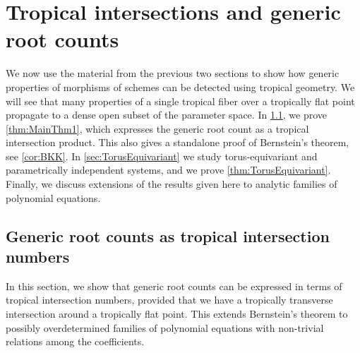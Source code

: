 \documentclass[12pt,reqno,a4paper]{amsart}
\theoremstyle{theoremstyle}
\theoremstyle{examplestyle}
\theoremstyle{algorithmstyle}
\begin{document}
\section{Tropical intersections and generic root counts}\label{sec:TropGeneric}

We now use the material from the previous two sections to show how generic properties of morphisms of schemes can be detected using tropical geometry. We will see that many properties of a single tropical fiber over a tropically flat point propagate to a dense open subset of the parameter space. %
In \cref{sec:GRCTropicalIntersectionNumber}, we prove %
\cref{thm:MainThm1}, which expresses the generic root count as a tropical intersection product. This also gives a standalone proof of Bernstein's theorem, see %
\cref{cor:BKK}. In \cref{sec:TorusEquivariant} we study torus-equivariant and parametrically independent systems, and we prove  \cref{thm:TorusEquivariant}. Finally, we discuss extensions of the results given here to analytic families of polynomial equations.


\subsection{Generic root counts as tropical intersection numbers}\label{sec:GRCTropicalIntersectionNumber}

In this section, we show that generic root counts can be expressed in terms of tropical intersection numbers, provided that we have a tropically transverse intersection around a tropically flat point. This extends Bernstein's theorem to possibly overdetermined families of polynomial equations with non-trivial relations among the coefficients.
\end{document}
